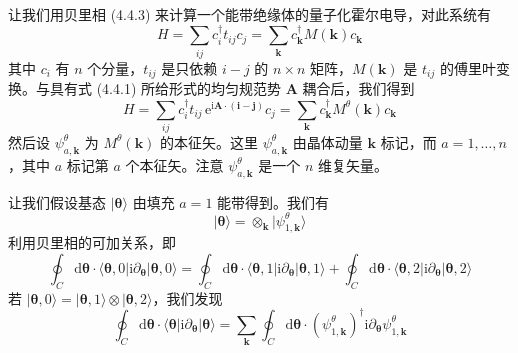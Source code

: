 让我们用贝里相 (4.4.3) 来计算一个能带绝缘体的量子化霍尔电导，对此系统有
\begin{equation*}
H = \sum_{ij} c_{i}^{\dagger} t_{ij} c_{j} = \sum_{\pmb{k}} c_{\pmb{k}}^{\dagger} M(\pmb{k}) c_{\pmb{k}} \tag{4.4.4}
\end{equation*}
其中 $c_{i}$ 有 $n$ 个分量，$t_{ij}$ 是只依赖 $i - j$ 的 $n \times n$ 矩阵，$M(\pmb{k})$ 是 $t_{ij}$ 的傅里叶变换。与具有式 (4.4.1) 所给形式的均匀规范势 $\pmb{A}$ 耦合后，我们得到
\begin{equation*}
H = \sum_{ij} c_{i}^{\dagger} t_{ij}\, \mathrm{e}^{\mathrm{i}\pmb{A}\cdot(\pmb{i}-\pmb{j})} c_{j} = \sum_{\pmb{k}} c_{\pmb{k}}^{\dagger} M^{\theta}(\pmb{k}) c_{\pmb{k}}
\end{equation*}
然后设 $\psi^{\theta}_{a,\pmb{k}}$ 为 $M^{\theta}(\pmb{k})$ 的本征矢。这里 $\psi^{\theta}_{a,\pmb{k}}$ 由晶体动量 $\pmb{k}$ 标记，而 $a = 1, \dots, n$，其中 $a$ 标记第 $a$ 个本征矢。注意 $\psi^{\theta}_{a,\pmb{k}}$ 是一个 $n$ 维复矢量。

让我们假设基态 $|\pmb{\theta}\rangle$ 由填充 $a = 1$ 能带得到。我们有
\begin{equation*}
| \pmb{\theta} \rangle = \otimes_{\pmb{k}} \big| \psi^{\theta}_{1,\pmb{k}} \big\rangle
\end{equation*}
利用贝里相的可加关系，即
\begin{equation*}
\oint_{C} \mathrm{d}\pmb{\theta} \cdot \langle \pmb{\theta}, 0 | \mathrm{i} \partial_{\pmb{\theta}} | \pmb{\theta}, 0 \rangle
= \oint_{C} \mathrm{d}\pmb{\theta} \cdot \langle \pmb{\theta}, 1 | \mathrm{i} \partial_{\pmb{\theta}} | \pmb{\theta}, 1 \rangle
+ \oint_{C} \mathrm{d}\pmb{\theta} \cdot \langle \pmb{\theta}, 2 | \mathrm{i} \partial_{\pmb{\theta}} | \pmb{\theta}, 2 \rangle
\end{equation*}
若 $|\pmb{\theta}, 0\rangle = |\pmb{\theta}, 1\rangle \otimes |\pmb{\theta}, 2\rangle$，我们发现
\begin{equation*}
\oint_{C} \mathrm{d}\pmb{\theta} \cdot \langle \pmb{\theta} | \mathrm{i} \partial_{\pmb{\theta}} | \pmb{\theta} \rangle
= \sum_{\pmb{k}} \oint_{C} \mathrm{d}\pmb{\theta} \cdot (\psi^{\theta}_{1,\pmb{k}})^{\dagger} \mathrm{i} \partial_{\pmb{\theta}} \psi^{\theta}_{1,\pmb{k}} \tag{4.4.5}
\end{equation*}


